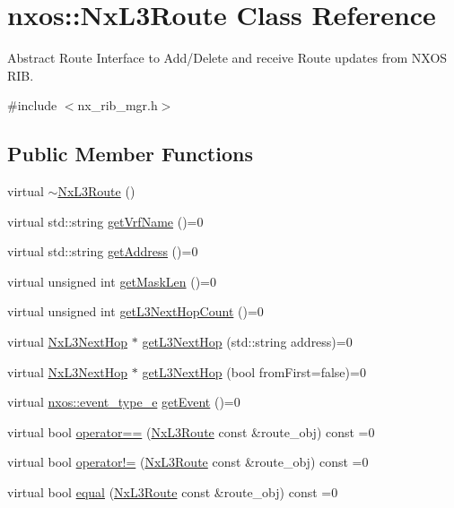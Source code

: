 \hypertarget{classnxos_1_1_nx_l3_route}{}\section{nxos\+:\+:Nx\+L3\+Route Class Reference}
\label{classnxos_1_1_nx_l3_route}


Abstract Route Interface to Add/\+Delete and receive Route updates from N\+X\+OS R\+IB.  




{\ttfamily \#include $<$nx\+\_\+rib\+\_\+mgr.\+h$>$}

\subsection*{Public Member Functions}
\begin{DoxyCompactItemize}
\item 
virtual \mbox{\hyperlink{classnxos_1_1_nx_l3_route_abb3762fb6629ba1900e877555cbb69dc}{$\sim$\+Nx\+L3\+Route}} ()
\item 
virtual std\+::string \mbox{\hyperlink{classnxos_1_1_nx_l3_route_a06ed660337e8b919dd801267957497d7}{get\+Vrf\+Name}} ()=0
\item 
virtual std\+::string \mbox{\hyperlink{classnxos_1_1_nx_l3_route_a3176245539589bf745ce1d196975b3c9}{get\+Address}} ()=0
\item 
virtual unsigned int \mbox{\hyperlink{classnxos_1_1_nx_l3_route_aaafa1d34e62297bbed574995ff48dba9}{get\+Mask\+Len}} ()=0
\item 
virtual unsigned int \mbox{\hyperlink{classnxos_1_1_nx_l3_route_a5e402096d7ff280b6f4d334b3bd954d4}{get\+L3\+Next\+Hop\+Count}} ()=0
\item 
virtual \mbox{\hyperlink{classnxos_1_1_nx_l3_next_hop}{Nx\+L3\+Next\+Hop}} $\ast$ \mbox{\hyperlink{classnxos_1_1_nx_l3_route_a960a2e429fd7514f0d40e64743e04872}{get\+L3\+Next\+Hop}} (std\+::string address)=0
\item 
virtual \mbox{\hyperlink{classnxos_1_1_nx_l3_next_hop}{Nx\+L3\+Next\+Hop}} $\ast$ \mbox{\hyperlink{classnxos_1_1_nx_l3_route_a7877c5328b1706acbbe5d8dbc6c94f4e}{get\+L3\+Next\+Hop}} (bool from\+First=false)=0
\item 
virtual \mbox{\hyperlink{namespacenxos_af9a9040b7681199d386e94eb888018cb}{nxos\+::event\+\_\+type\+\_\+e}} \mbox{\hyperlink{classnxos_1_1_nx_l3_route_a9ca0b236a35cc616753e09e620b6b02f}{get\+Event}} ()=0
\item 
virtual bool \mbox{\hyperlink{classnxos_1_1_nx_l3_route_a1680de6899caf8fa1be3ecfad131cd25}{operator==}} (\mbox{\hyperlink{classnxos_1_1_nx_l3_route}{Nx\+L3\+Route}} const \&route\+\_\+obj) const =0
\item 
virtual bool \mbox{\hyperlink{classnxos_1_1_nx_l3_route_a945f75e6656623cbf8cf23b6ab7e01d3}{operator!=}} (\mbox{\hyperlink{classnxos_1_1_nx_l3_route}{Nx\+L3\+Route}} const \&route\+\_\+obj) const =0
\item 
virtual bool \mbox{\hyperlink{classnxos_1_1_nx_l3_route_a6dc5e111e8e8ad48aa028fc65cc483b9}{equal}} (\mbox{\hyperlink{classnxos_1_1_nx_l3_route}{Nx\+L3\+Route}} const \&route\+\_\+obj) const =0
\end{DoxyCompactItemize}


